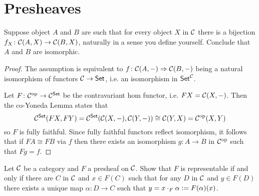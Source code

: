 \section{Presheaves}

\begin{exercise}{55}
    Suppose object $A$ and $B$ are such that for every object $X$ in $\mathcal{C}$ there is a bijection $f_X\colon\mathcal{C}(A,X)\to\mathcal{C}(B,X)$, naturally in a sense you define yourself. 
    Conclude that $A$ and $B$ are isomorphic.
\end{exercise}
\begin{solution}
    \begin{proof}
        The assumption is equivalent to $f\colon\mathcal{C}(A,-)\Rightarrow\mathcal{C}(B,-)$ being a natural isomorphism of functors $\mathcal{C}\to\normalfont\mathsf{Set}$, i.e. an isomorphism in ${\normalfont\mathsf{Set}}^{\mathcal{C}}$.
        
        Let $F\colon\mathcal{C}^{\text{op}}\to{\mathcal{C}}^{\normalfont\mathsf{Set}}$ be the contravariant hom functor, i.e. $FX=\mathcal{C}(X,-)$.        
        Then the co-Yoneda Lemma states that 
        \[{\mathcal{C}}^{\normalfont\mathsf{Set}}(FX,FY)={\mathcal{C}}^{\normalfont\mathsf{Set}}(\mathcal{C}(X,-),\mathcal{C}(Y, -))\cong \mathcal{C}(Y,X)=\mathcal{C}^{\text{op}}(X,Y)\]
        so $F$ is fully faithful.
        Since fully faithful functors reflect isomorphism, it follows that if $FA\cong FB$ via $f$ then there exists an isomorphism $g\colon A\to B$ in $\mathcal{C}^{\text{op}}$ such that $Fg=f$.
    \end{proof}
\end{solution}
\begin{exercise}{8.1}
    Let $\mathcal{C}$ be a category and $F$ a presheaf on $\mathcal{C}$. 
    Show that $F$ is representable if and only if there are $C$ in $\mathcal{C}$ and $x\in F(C)$ such that for any $D$ in $\mathcal{C}$ and $y\in F(D)$ there exists a unique map $\alpha\colon D\to C$ such that $y=x\cdot_F\alpha\vcentcolon= F(\alpha)(x)$.
\end{exercise}
